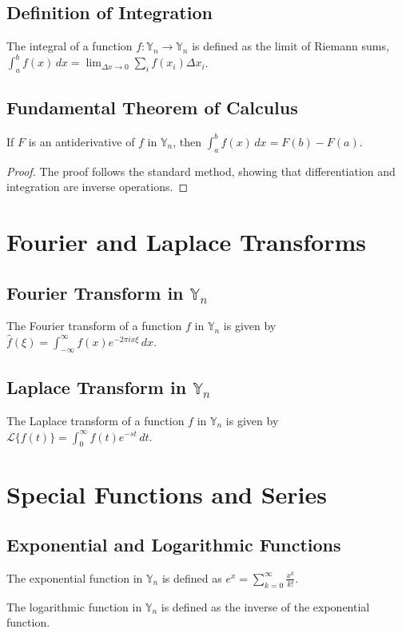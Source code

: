 \documentclass[12pt]{book}
\begin{document}
\subsection{Definition of Integration}
\begin{definition}
The integral of a function $f: \mathbb{Y}_n \to \mathbb{Y}_n$ is defined as the limit of Riemann sums, $\int_a^b f(x) \, dx = \lim_{\Delta x \to 0} \sum_{i} f(x_i) \Delta x_i$.
\end{definition}
\subsection{Fundamental Theorem of Calculus}
\begin{theorem}
If $F$ is an antiderivative of $f$ in $\mathbb{Y}_n$, then $\int_a^b f(x) \, dx = F(b) - F(a)$.
\end{theorem}
\begin{proof}
The proof follows the standard method, showing that differentiation and integration are inverse operations.
\end{proof}

\section{Fourier and Laplace Transforms}
\subsection{Fourier Transform in $\mathbb{Y}_n$}
\begin{definition}
The Fourier transform of a function $f$ in $\mathbb{Y}_n$ is given by $\hat{f}(\xi) = \int_{-\infty}^{\infty} f(x) e^{-2 \pi i x \xi} \, dx$.
\end{definition}
\subsection{Laplace Transform in $\mathbb{Y}_n$}
\begin{definition}
The Laplace transform of a function $f$ in $\mathbb{Y}_n$ is given by $\mathcal{L}\{f(t)\} = \int_0^{\infty} f(t) e^{-st} \, dt$.
\end{definition}

\section{Special Functions and Series}
\subsection{Exponential and Logarithmic Functions}
\begin{definition}
The exponential function in $\mathbb{Y}_n$ is defined as $e^x = \sum_{k=0}^{\infty} \frac{x^k}{k!}$.
\end{definition}
\begin{definition}
The logarithmic function in $\mathbb{Y}_n$ is defined as the inverse of the exponential function.
\end{definition}
\end{document}
